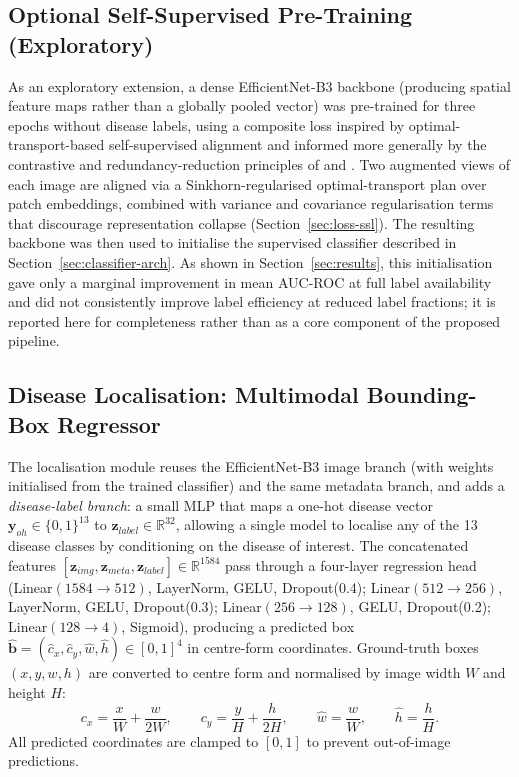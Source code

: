 \documentclass[preprint,12pt,authoryear]{elsarticle}
\begin{document}
\subsection{Optional Self-Supervised Pre-Training (Exploratory)}
\label{sec:ssl}

As an exploratory extension, a dense EfficientNet-B3 backbone (producing spatial feature maps rather than a globally pooled vector) was pre-trained for three epochs without disease labels, using a composite loss inspired by optimal-transport-based self-supervised alignment \citep{otcxr} and informed more generally by the contrastive and redundancy-reduction principles of \citet{simclr} and \citet{barlow_twins}. Two augmented views of each image are aligned via a Sinkhorn-regularised optimal-transport plan over patch embeddings, combined with variance and covariance regularisation terms that discourage representation collapse (Section~\ref{sec:loss-ssl}). The resulting backbone was then used to initialise the supervised classifier described in Section~\ref{sec:classifier-arch}. As shown in Section~\ref{sec:results}, this initialisation gave only a marginal improvement in mean AUC-ROC at full label availability and did not consistently improve label efficiency at reduced label fractions; it is reported here for completeness rather than as a core component of the proposed pipeline.

\subsection{Disease Localisation: Multimodal Bounding-Box Regressor}
\label{sec:bbox-arch}

The localisation module reuses the EfficientNet-B3 image branch (with weights initialised from the trained classifier) and the same metadata branch, and adds a \emph{disease-label branch}: a small MLP that maps a one-hot disease vector $\mathbf{y}_{oh} \in \{0,1\}^{13}$ to $\mathbf{z}_{label} \in \mathbb{R}^{32}$, allowing a single model to localise any of the 13 disease classes by conditioning on the disease of interest. The concatenated features $[\mathbf{z}_{img}, \mathbf{z}_{meta}, \mathbf{z}_{label}] \in \mathbb{R}^{1584}$ pass through a four-layer regression head (Linear$(1584\rightarrow512)$, LayerNorm, GELU, Dropout(0.4); Linear$(512\rightarrow256)$, LayerNorm, GELU, Dropout(0.3); Linear$(256\rightarrow128)$, GELU, Dropout(0.2); Linear$(128\rightarrow4)$, Sigmoid), producing a predicted box $\hat{\mathbf{b}} = (\hat{c}_x, \hat{c}_y, \hat{w}, \hat{h}) \in [0,1]^4$ in centre-form coordinates. Ground-truth boxes $(x, y, w, h)$ are converted to centre form and normalised by image width $W$ and height $H$:
\begin{equation}
c_x = \frac{x}{W} + \frac{w}{2W}, \qquad c_y = \frac{y}{H} + \frac{h}{2H}, \qquad \hat{w} = \frac{w}{W}, \qquad \hat{h} = \frac{h}{H}.
\end{equation}
All predicted coordinates are clamped to $[0,1]$ to prevent out-of-image predictions.
\end{document}
